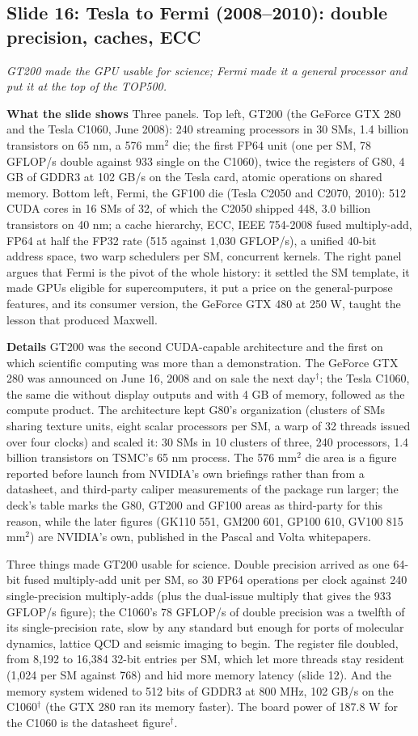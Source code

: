 \documentclass[11pt,letterpaper]{article}
\newcommand{\slide}[3]{%
  \subsection[Slide #1: #2]{Slide #1: #2}%
  {\color{muted}\itshape #3\par}\medskip}
\newcommand{\para}[1]{\medskip\noindent\textbf{#1}\quad}
\begin{document}
\slide{16}{Tesla to Fermi (2008--2010): double precision, caches, ECC}{GT200 made the GPU usable for science; Fermi made it a general processor and put it at the top of the TOP500.}

\para{What the slide shows} Three panels. Top left, GT200 (the GeForce GTX 280 and the Tesla C1060, June 2008): 240 streaming processors in 30 SMs, 1.4 billion transistors on 65 nm, a 576 mm$^2$ die; the first FP64 unit (one per SM, 78 GFLOP/s double against 933 single on the C1060), twice the registers of G80, 4 GB of GDDR3 at 102 GB/s on the Tesla card, atomic operations on shared memory. Bottom left, Fermi, the GF100 die (Tesla C2050 and C2070, 2010): 512 CUDA cores in 16 SMs of 32, of which the C2050 shipped 448, 3.0 billion transistors on 40 nm; a cache hierarchy, ECC, IEEE 754-2008 fused multiply-add, FP64 at half the FP32 rate (515 against 1,030 GFLOP/s), a unified 40-bit address space, two warp schedulers per SM, concurrent kernels. The right panel argues that Fermi is the pivot of the whole history: it settled the SM template, it made GPUs eligible for supercomputers, it put a price on the general-purpose features, and its consumer version, the GeForce GTX 480 at 250 W, taught the lesson that produced Maxwell.

\para{Details} GT200 was the second CUDA-capable architecture and the first on which scientific computing was more than a demonstration. The GeForce GTX 280 was announced on June 16, 2008 and on sale the next day$^\dagger$; the Tesla C1060, the same die without display outputs and with 4 GB of memory, followed as the compute product. The architecture kept G80's organization (clusters of SMs sharing texture units, eight scalar processors per SM, a warp of 32 threads issued over four clocks) and scaled it: 30 SMs in 10 clusters of three, 240 processors, 1.4 billion transistors on TSMC's 65 nm process. The 576 mm$^2$ die area is a figure reported before launch from NVIDIA's own briefings rather than from a datasheet, and third-party caliper measurements of the package run larger; the deck's table marks the G80, GT200 and GF100 areas as third-party for this reason, while the later figures (GK110 551, GM200 601, GP100 610, GV100 815 mm$^2$) are NVIDIA's own, published in the Pascal and Volta whitepapers.

Three things made GT200 usable for science. Double precision arrived as one 64-bit fused multiply-add unit per SM, so 30 FP64 operations per clock against 240 single-precision multiply-adds (plus the dual-issue multiply that gives the 933 GFLOP/s figure); the C1060's 78 GFLOP/s of double precision was a twelfth of its single-precision rate, slow by any standard but enough for ports of molecular dynamics, lattice QCD and seismic imaging to begin. The register file doubled, from 8,192 to 16,384 32-bit entries per SM, which let more threads stay resident (1,024 per SM against 768) and hid more memory latency (slide 12). And the memory system widened to 512 bits of GDDR3 at 800 MHz, 102 GB/s on the C1060$^\dagger$ (the GTX 280 ran its memory faster). The board power of 187.8 W for the C1060 is the datasheet figure$^\dagger$.
\end{document}
